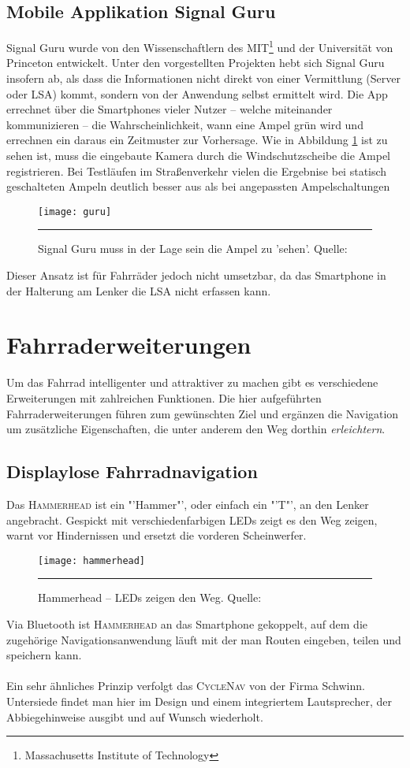 \subsection*{Mobile Applikation Signal Guru}
Signal Guru wurde von den Wissenschaftlern des MIT\footnote{ Massachusetts Institute of Technology} und der Universität von Princeton entwickelt. Unter den vorgestellten Projekten hebt sich Signal Guru insofern ab, als dass die Informationen nicht direkt von einer Vermittlung (Server oder \gls{LSA}) kommt, sondern von der Anwendung selbst ermittelt wird. Die \Gls{App} errechnet über die \glspl{Smartphone} vieler Nutzer -- welche miteinander kommunizieren -- die Wahrscheinlichkeit, wann eine Ampel grün wird und errechnen ein daraus ein Zeitmuster zur Vorhersage. Wie in Abbildung \ref{fig:AppSignalGuru} ist zu sehen ist, muss die eingebaute Kamera durch die Windschutzscheibe die Ampel registrieren. Bei Testläufen im Straßenverkehr vielen die Ergebnise bei statisch geschalteten Ampeln deutlich besser aus als bei angepassten Ampelschaltungen \cite{SignalGuruPaper} 
\begin{figure}[H]
    \centering
    \texttt{[image: guru]}
    \rule{35em}{0.5pt}
    \caption[Signal Guru]{Signal Guru muss in der Lage sein die Ampel zu 'sehen'.  Quelle: \cite{SignalGuruPaper}} \label{fig:AppSignalGuru}
\end{figure}
Dieser Ansatz ist für Fahrräder jedoch nicht umsetzbar, da das \gls{Smartphone} in der Halterung am Lenker die \gls{LSA} nicht erfassen kann.
\clearpage
\section{Fahrraderweiterungen}
Um das Fahrrad intelligenter und attraktiver zu machen gibt es verschiedene Erweiterungen mit zahlreichen Funktionen. Die hier aufgeführten Fahrraderweiterungen führen zum gewünschten Ziel und ergänzen die Navigation um zusätzliche Eigenschaften, die unter anderem den Weg dorthin \textit{erleichtern}.
\subsection{Displaylose Fahrradnavigation}
Das \textsc{Hammerhead} ist ein "'Hammer"', oder einfach ein "'T"', an den Lenker angebracht. Gespickt mit verschiedenfarbigen \glspl{LED} zeigt es den Weg zeigen, warnt vor Hindernissen und ersetzt die vorderen Scheinwerfer.
\begin{figure}[H]
    \centering
    \texttt{[image: hammerhead]}
    \rule{35em}{0.5pt}
    \caption[Hammerhead]{Hammerhead -- \glspl{LED} zeigen den Weg.  Quelle: \cite{Hammerhead}} 
    \label{fig:hammerhead}
\end{figure}
Via Bluetooth ist \textsc{Hammerhead} an das \gls{Smartphone} gekoppelt, auf dem die zugehörige Navigationsanwendung läuft mit der man Routen eingeben, teilen und speichern kann\cite{Hammerhead}.\\\\
Ein sehr ähnliches Prinzip verfolgt das \textsc{CycleNav} von der Firma Schwinn. Untersiede findet man hier im Design und einem integriertem Lautsprecher, der Abbiegehinweise ausgibt und auf Wunsch wiederholt\cite{CycleNav}.
